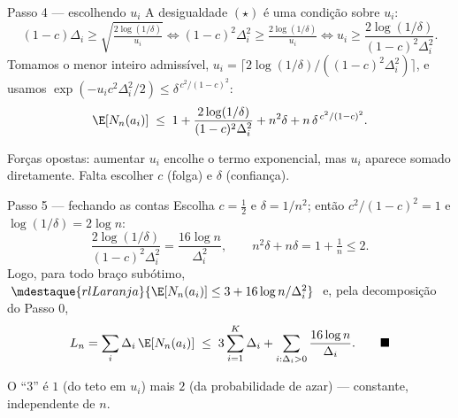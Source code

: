 \documentclass[aspectratio=169, 11pt]{beamer}
\begin{document}
\begin{frame}{Passo 4 --- escolhendo $u_i$}
  A desigualdade $(\star)$ é uma condição sobre $u_i$:
  \vspace{-0.3em}
  \[
    (1-c)\Delta_i \ge \sqrt{\tfrac{2\log(1/\delta)}{u_i}}
    \iff (1-c)^{2}\Delta_i^{2} \ge \tfrac{2\log(1/\delta)}{u_i}
    \iff u_i \ge \frac{2\log(1/\delta)}{(1-c)^{2}\Delta_i^{2}} .
  \]
  Tomamos o menor inteiro admissível,
  $u_i = \bigl\lceil 2\log(1/\delta)/((1-c)^{2}\Delta_i^{2})\bigr\rceil$, e usamos
  $\exp(-u_i c^{2}\Delta_i^{2}/2) \le \delta^{\,c^{2}/(1-c)^{2}}$:
  \vspace{-0.2em}
  \[
    \E[N_n(a_i)] \;\le\;
      1 + \frac{2\log(1/\delta)}{(1-c)^{2}\Delta_i^{2}}
      + n^{2}\delta + n\,\delta^{\,c^{2}/(1-c)^{2}} .
  \]

  \begin{ideiabox}
    Forças opostas: aumentar $u_i$ encolhe o termo exponencial, mas $u_i$
    aparece somado diretamente. Falta escolher $c$ (folga) e $\delta$
    (confiança).
  \end{ideiabox}
\end{frame}

\begin{frame}{Passo 5 --- fechando as contas}
  Escolha $c=\tfrac12$ e $\delta = 1/n^{2}$; então
  $c^{2}/(1-c)^{2}=1$ e $\log(1/\delta)=2\log n$:
  \[
    \frac{2\log(1/\delta)}{(1-c)^{2}\Delta_i^{2}} = \frac{16\log n}{\Delta_i^{2}},
    \qquad
    n^{2}\delta + n\delta = 1 + \tfrac1n \le 2 .
  \]
  Logo, para todo braço subótimo,
  $\;\mdestaque{rlLaranja}{\E[N_n(a_i)] \le 3 + 16\log n/\Delta_i^{2}}\;$
  e, pela decomposição do Passo 0,
  \[
    L_n = \sum_i \Delta_i\,\E[N_n(a_i)]
      \;\le\; 3\sum_{i=1}^{K}\Delta_i + \sum_{i:\Delta_i>0}\frac{16\log n}{\Delta_i}.
    \qquad\blacksquare
  \]

  {\small\color{rlCinza} O ``3'' é $1$ (do teto em $u_i$) mais $2$ (da
  probabilidade de azar) --- constante, independente de $n$.}
\end{frame}
\end{document}
